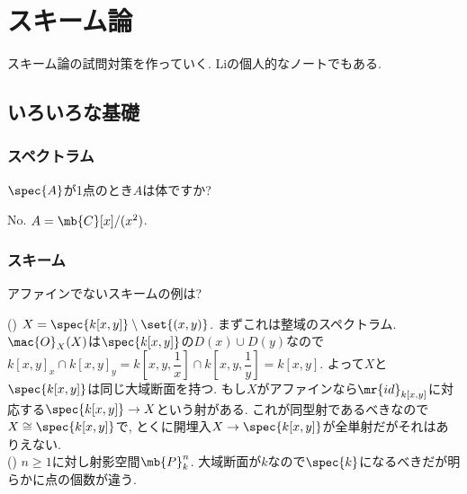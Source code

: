 \chapter{スキーム論}
スキーム論の試問対策を作っていく. Liの個人的なノートでもある. 
\section{いろいろな基礎}



\subsection{スペクトラム}

\begin{egprob} 
$\spec{A}$が1点のとき$A$は体ですか?
\end{egprob}
\begin{egans}
No. $A=\mb{C}[x]/(x^2)$.
\end{egans}


\subsection{スキーム}
\begin{egprob}
アファインでないスキームの例は? 
\end{egprob}
\begin{egans}
() $X = \spec{k[x,y]} \setminus{\set{(x,y)}}$. まずこれは整域のスペクトラム. $\mac{O}_{X}(X)$は$\spec{k[x,y]}$の$D(x)\cup D(y)$なので$k[x,y]_{x} \cap k[x,y]_{y} = k[x,y,\dfrac{1}{x}] \cap k[x,y,\dfrac{1}{y}] = k[x,y]$. よって$X$と$\spec{k[x,y]}$は同じ大域断面を持つ. もし$X$がアファインなら$\mr{id}_{k[x,y]}$に対応する$\spec{k[x,y]}\to X$という射がある. これが同型射であるべきなので$X\cong \spec{k[x,y]}$で, とくに開埋入$X\to \spec{k[x,y]}$が全単射だがそれはありえない.  \\
() $n\geq 1$に対し射影空間$\mb{P}^{n}_{k}$. 大域断面が$k$なので$\spec{k}$になるべきだが明らかに点の個数が違う. 
\end{egans}

\begin{egprob}

\end{egprob}




























